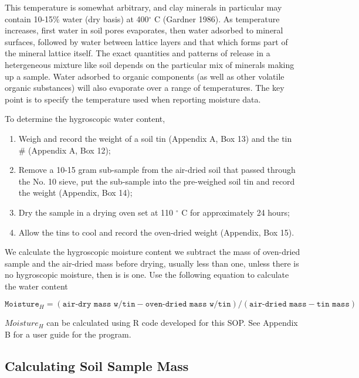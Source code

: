 \documentclass[12pt]{../SOP3_alpha}
\begin{document}
\NP This temperature is somewhat arbitrary, and clay minerals in particular may contain 10-15\% water (dry basis) at 400$^\circ$ C (Gardner 1986).  As temperature increases, first water in soil pores evaporates, then water adsorbed to mineral surfaces, followed by water between lattice layers and that which forms part of the mineral lattice itself.  The exact quantities and patterns of release in a hetergeneous mixture like soil depends on the particular mix of minerals making up a sample.  Water adsorbed to organic components (as well as other volatile organic substances) will also evaporate over a range of temperatures.  The key point is to specify the temperature used when reporting moisture data.

\NP To determine the hygroscopic water content,

\begin{enumerate}
	\item Weigh and record the weight of a soil tin (Appendix A, Box 13) and the tin \# (Appendix A, Box 12);
	\item Remove a 10-15 gram sub-sample from the air-dried soil that passed through the No. 10 sieve, put the sub-sample into the pre-weighed soil tin and record the weight (Appendix, Box 14);
	\item Dry the sample in a drying oven set at 110 $^\circ$ C for approximately 24 hours;
	\item Allow the tins to cool and record the oven-dried weight (Appendix, Box 15). 
\end{enumerate}

\NP We calculate the  hygroscopic moisture content we subtract the mass of oven-dried sample and the air-dried mass before drying, usually less than one, unless there is no hygroscopic moisture, then is is one. Use the following equation to calculate the water content

\begin{equation}
\texttt{Moisture}_H = (\texttt{air-dry mass w/tin} - \texttt{oven-dried mass w/tin})/(\texttt{air-dried mass} - \texttt{tin mass})
\end{equation}

\noindent $Moisture_H$ can be calculated using R code developed for this SOP. See Appendix B for a user guide for the program. 

\subsection{Calculating Soil Sample Mass}
\end{document}
